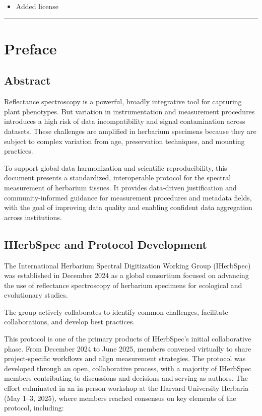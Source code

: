 \documentclass[
  letterpaper,
  DIV=11,
  numbers=noendperiod]{scrreprt}
\providecommand{\tightlist}{%
  \setlength{\itemsep}{0pt}\setlength{\parskip}{0pt}}
\begin{document}
\begin{itemize}
\tightlist
\item
  Added license
\end{itemize}

\begin{center}\rule{0.5\linewidth}{0.5pt}\end{center}


\chapter{Preface}\label{preface}

\section{Abstract}\label{preface}

Reflectance spectroscopy is a powerful, broadly integrative tool for
capturing plant phenotypes. But variation in instrumentation and
measurement procedures introduces a high risk of data incompatibility
and signal contamination across datasets. These challenges are amplified
in herbarium specimens because they are subject to complex variation
from age, preservation techniques, and mounting practices.

To support global data harmonization and scientific reproducibility,
this document presents a standardized, interoperable protocol for the
spectral measurement of herbarium tissues. It provides data-driven
justification and community-informed guidance for measurement procedures
and metadata fields, with the goal of improving data quality and
enabling confident data aggregation across institutions.

\section{IHerbSpec and Protocol
Development}\label{iherbspec-and-protocol-development}

The International Herbarium Spectral Digitization Working Group
(IHerbSpec) was established in December 2024 as a global consortium
focused on advancing the use of reflectance spectroscopy of herbarium
specimens for ecological and evolutionary studies.

The group actively collaborates to identify common challenges,
facilitate collaborations, and develop best practices.

This protocol is one of the primary products of IHerbSpec's initial
collaborative phase. From December 2024 to June 2025, members convened
virtually to share project-specific workflows and align measurement
strategies. The protocol was developed through an open, collaborative
process, with a majority of IHerbSpec members contributing to
discussions and decisions and serving as authors. The effort culminated
in an in-person workshop at the Harvard University Herbaria (May 1--3,
2025), where members reached consensus on key elements of the protocol,
including:
\end{document}
